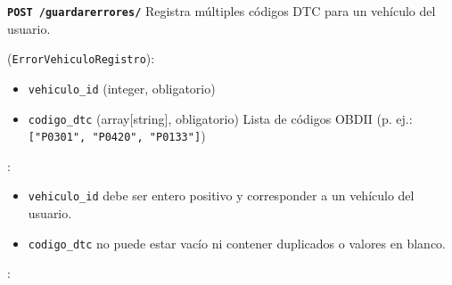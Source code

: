 \documentclass[a4paper,11pt,spanish]{sphinxmanual}
\newcommand{\robotoMonoBold}{\fontseries{b}\selectfont\ttfamily}
\renewcommand{\sphinxcode}[1]{\textcolor{sphinxorangeCode}{{\robotoMonoBold #1}}}
\renewcommand{\sphinxbfcode}[1]{\textbf{\sphinxcode{#1}}}
\renewcommand{\sphinxupquote}[1]{\texttt{#1}}
\begin{document}
\begin{fulllineitems}
\label{\detokenize{endpoints:post--guardar-errores-}}
\pysigstartsignatures
\pysigline
{\sphinxbfcode{\sphinxupquote{POST~}}\sphinxbfcode{\sphinxupquote{/guardar\sphinxhyphen{}errores/}}}
\pysigstopsignatures
\sphinxAtStartPar
Registra múltiples códigos DTC para un vehículo del usuario.

\sphinxAtStartPar
{} (\sphinxcode{\sphinxupquote{ErrorVehiculoRegistro}}):
\begin{itemize}
\item {} 
\sphinxAtStartPar
\sphinxcode{\sphinxupquote{vehiculo\_id}} (integer, obligatorio)

\item {} 
\sphinxAtStartPar
\sphinxcode{\sphinxupquote{codigo\_dtc}} (array{[}string{]}, obligatorio)
\sphinxhyphen{} Lista de códigos OBD\sphinxhyphen{}II (p. ej.: \sphinxcode{\sphinxupquote{{[}"P0301", "P0420", "P0133"{]}}})

\end{itemize}

\sphinxAtStartPar
{}:
\begin{itemize}
\item {} 
\sphinxAtStartPar
\sphinxcode{\sphinxupquote{vehiculo\_id}} debe ser entero positivo y corresponder a un vehículo del usuario.

\item {} 
\sphinxAtStartPar
\sphinxcode{\sphinxupquote{codigo\_dtc}} no puede estar vacío ni contener duplicados o valores en blanco.

\end{itemize}

\sphinxAtStartPar
{}:

\begin{sphinxVerbatim}[commandchars=\\\{\}]
  
 
 
 

\PYG{p}{[}\PYG{p}{]}
\end{sphinxVerbatim}


\end{fulllineitems}
\end{document}
